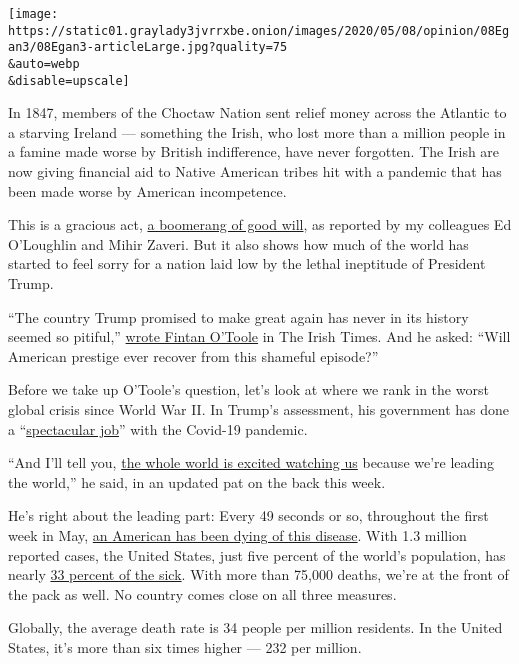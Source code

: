 \texttt{[image: https://static01.graylady3jvrrxbe.onion/images/2020/05/08/opinion/08Egan3/08Egan3-articleLarge.jpg?quality=75\\\&auto=webp\\\&disable=upscale]}

In 1847, members of the Choctaw Nation sent relief money across the
Atlantic to a starving Ireland --- something the Irish, who lost more
than a million people in a famine made worse by British indifference,
have never forgotten. The Irish are now giving financial aid to Native
American tribes hit with a pandemic that has been made worse by American
incompetence.

This is a gracious act,
\href{https://www.nytimes3xbfgragh.onion/2020/05/05/world/coronavirus-ireland-native-american-tribes.html}{a
boomerang of good will}, as reported by my colleagues Ed O'Loughlin and
Mihir Zaveri. But it also shows how much of the world has started to
feel sorry for a nation laid low by the lethal ineptitude of President
Trump.

``The country Trump promised to make great again has never in its
history seemed so pitiful,''
\href{https://www.irishtimes.com/opinion/fintan-o-toole-donald-trump-has-destroyed-the-country-he-promised-to-make-great-again-1.4235928}{wrote
Fintan O'Toole} in The Irish Times. And he asked: ``Will American
prestige ever recover from this shameful episode?''

Before we take up O'Toole's question, let's look at where we rank in the
worst global crisis since World War II. In Trump's assessment, his
government has done a
``\href{https://www.cnn.com/2020/05/01/world/meanwhile-in-america-may-1/index.html}{spectacular
job}'' with the Covid-19 pandemic.

``And I'll tell you,
\href{https://www.whitehouse.gov/briefings-statements/remarks-president-trump-marine-one-departure-89/}{the
whole world is excited watching us} because we're leading the world,''
he said, in an updated pat on the back this week.

He's right about the leading part: Every 49 seconds or so, throughout
the first week in May,
\href{https://www.nytimes3xbfgragh.onion/interactive/2020/us/coronavirus-us-cases.html}{an
American has been dying of this disease}. With 1.3 million reported
cases, the United States, just five percent of the world's population,
has nearly \href{https://www.worldometers.info/coronavirus/}{33 percent
of the sick}. With more than 75,000 deaths, we're at the front of the
pack as well. No country comes close on all three measures.

Globally, the average death rate is 34 people per million residents. In
the United States, it's more than six times higher --- 232 per million.

